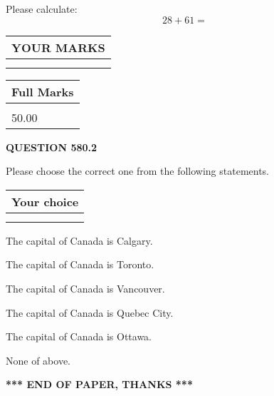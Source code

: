 \documentclass[12pt]{article}
\begin{document}
  
 
Please calculate:
\begin{equation}
28 +  %
61 = \nonumber
\end{equation}
 

 

 
  
\vspace{0.2in}
  
\noindent\begin{tabular}{|l|}
\hline
 YOUR MARKS  \\
\hline
 \\ 
 \\ 
\hline
\end{tabular}
\hspace{0.05in} \begin{tabular}{|l|}
\hline
 Full Marks  \\
\hline
 \\ 
50.00 \\
\hline
\end{tabular}
{\textbf{\Large{QUESTION
580.2 
}}}
  
  
Please choose the correct one from the following statements.
  
  
\noindent\hspace{3.0in} \begin{tabular}{|l|}
\hline
Your choice \\
\hline
 \\ 
 \\ 
\hline
\end{tabular}
  
  
 
 
The capital of Canada is Calgary.
 
 
The capital of Canada is Toronto.
 
 
The capital of Canada is Vancouver.
 
 
The capital of Canada is Quebec City.
 
 
The capital of Canada is Ottawa.
 
 
 None of above.
 
 
   
   
 \vspace{0.2in}
 
   
   
   
   
\vspace{1.0in} 
{\textbf{\large{ *** END OF PAPER, THANKS *** }}} 
   
\end{document}
